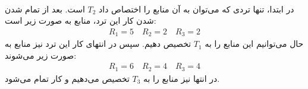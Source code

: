 \\\noindent
در ابتدا، تنها تردی که می‌توان به آن منابع را اختصاص داد
$T_2$
است. بعد از تمام شدن شدن کار این ترد، منابع به صورت زیر است:
\begin{gather*}
    R_1 = 5 \quad
    R_2 = 2 \quad
    R_3 = 2
\end{gather*}
\noindent
حال می‌توانیم این منابع را به
$T_1$
تخصیص دهیم. سپس در انتهای کار این ترد نیز منابع به صورت زیر می‌شوند:
\begin{gather*}
    R_1 = 6 \quad
    R_2 = 4 \quad
    R_3 = 4
\end{gather*}
\noindent
در انتها نیز منابع را به
$T_3$
تخصیص می‌دهیم و کار تمام می‌شود.


